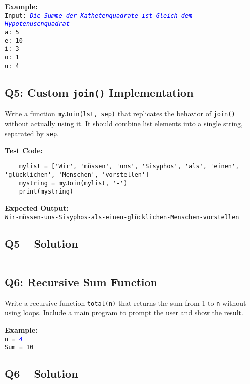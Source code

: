 \documentclass[a4paper,11pt]{article}
\begin{document}
\textbf{Example:}\\
\texttt{Input: \textcolor{blue}{\textit{Die Summe der Kathetenquadrate ist Gleich dem Hypotenusenquadrat}}}\\
\texttt{a: 5\\e: 10\\i: 3\\o: 1\\u: 4}

\subsection*{Q5: Custom \texttt{join()} Implementation}
Write a function \texttt{myJoin(lst, sep)} that replicates the behavior of \texttt{join()} without actually using it. It should combine list elements into a single string, separated by \texttt{sep}.

\textbf{Test Code:}
\begin{verbatim}
	mylist = ['Wir', 'müssen', 'uns', 'Sisyphos', 'als', 'einen', 'glücklichen', 'Menschen', 'vorstellen']
	mystring = myJoin(mylist, '-')
	print(mystring)
\end{verbatim}

\textbf{Expected Output:}\\
\texttt{Wir-müssen-uns-Sisyphos-als-einen-glücklichen-Menschen-vorstellen}

\subsection*{Q5 – Solution}
\inputminted{python}{Files/4/5.py}


\subsection*{Q6: Recursive Sum Function}
Write a recursive function \texttt{total(n)} that returns the sum from 1 to \texttt{n} without using loops. Include a main program to prompt the user and show the result.

\textbf{Example:}\\
\texttt{n = \textcolor{blue}{\textit{4}}}\\
\texttt{Sum = 10}




\subsection*{Q6 – Solution}
\inputminted{python}{Files/4/6.py}
\end{document}
